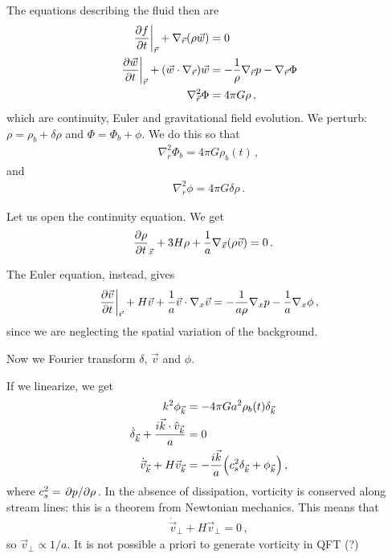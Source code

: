 \documentclass[main.tex]{subfiles}
\begin{document}
The equations describing the fluid then are 
%
\begin{align}
\eval{\pdv{f}{t}}_{\vec{r}} + \nabla_{\vec{r}} \qty(\rho \vec{w}) &= 0  \\
\eval{\pdv{\vec{w}}{t}}_{\vec{r}} + \qty(\vec{w} \cdot \nabla_{\vec{r}}) \vec{w} &= - \frac{1}{\rho } \nabla_{\vec{r}} p - \nabla_{\vec{r}} \Phi  \\
\nabla^2_{\vec{r}} \Phi &= 4 \pi G \rho 
\,,
\end{align}
%
which are continuity, Euler and gravitational field evolution. 
We perturb: \(\rho = \rho_{b} + \delta \rho \) and \(\Phi = \Phi_{b} + \phi  \). 
We do this so that 
%
\begin{align}
\nabla^2_{r} \Phi_{b} = 4 \pi G \rho_{b} (t)
\,,
\end{align}
%
and 
%
\begin{align}
\nabla^2_{r} \phi = 4 \pi G \delta \rho 
\,.
\end{align}

Let us open the continuity equation. We get 
%
\begin{align}
\pdv{\rho }{t}_{\vec{x}} + 3 H \rho + \frac{1}{a} \nabla_{\vec{x}} \qty(\rho \vec{v}) &= 0
\,.
\end{align}

The Euler equation, instead, gives 
%
\begin{align}
\eval{\pdv{\vec{v}}{t}}_{\vec{r}} + 
H \vec{v}  + \frac{1}{a} \vec{v} \cdot \nabla_{x} \vec{v}
= - \frac{1}{a \rho } \nabla_{x} p
- \frac{1}{a} \nabla_{x} \phi 
\,,
\end{align}
%
since we are neglecting the spatial variation of the background.

Now we Fourier transform \(\delta \), \(\vec{v}\) and \(\phi \).

If we linearize, we get 
%
\begin{align}
k^2 \phi_{\vec{k}} &= - 4 \pi G a^2 \rho_{b} (t) \delta_{\vec{k}}  \\
\dot{\delta}_{\vec{k}} + \frac{i \vec{k} \cdot \hat{v}_{\vec{k}}}{a} &=0  \\
\dot{\vec{v}}_{\vec{k}} + H \vec{v}_{\vec{k}} &= - \frac{i \vec{k}}{a} 
\qty(c_s^2 \delta_{\vec{k}} + \phi_{\vec{k}})
\,,
\end{align}
%
where \(c_s^2 = \pdv*{p}{\rho }\).
In the absence of dissipation, vorticity is conserved along stream lines: this is a theorem from Newtonian mechanics. 
This means that 
%
\begin{align}
\dot{\vec{v}}_{\perp} + H \vec{v}_{\perp} = 0
\,,
\end{align}
%
so \(\vec{v}_{\perp} \propto 1 / a\). 
It is not possible a priori to generate vorticity in QFT (?)
\end{document}
